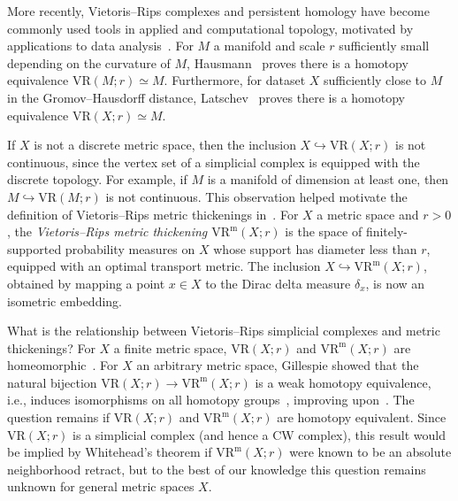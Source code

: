\documentclass[11pt, reqno, english]{amsart}
\theoremstyle{plain}
\theoremstyle{definition}
\theoremstyle{myremark}
\newcommand{\vr}[2]{\mathrm{VR}(#1;#2)}
\newcommand{\vrm}[2]{\mathrm{VR}^\mathrm{m}(#1;#2)}
\begin{document}
More recently, Vietoris--Rips complexes and persistent homology have become commonly used tools in applied and computational topology, motivated by applications to
data analysis~\cite{CarlssonIshkhanovDeSilvaZomorodian2008,ghrist2008barcodes}.
For $M$ a manifold and scale $r$ sufficiently small depending on the curvature of $M$, Hausmann~\cite{Hausmann1995} proves there is a homotopy equivalence $\vr{M}{r} \simeq M$.
Furthermore, for dataset $X$ sufficiently close to $M$ in the Gromov--Hausdorff distance, Latschev~\cite{Latschev2001} proves there is a homotopy equivalence $\vr{X}{r} \simeq M$.

If $X$ is not a discrete metric space, then the inclusion $X\hookrightarrow\vr{X}{r}$ is not continuous, since the vertex set of a simplicial complex is equipped with the discrete topology.
For example, if $M$ is a manifold of dimension at least one, then $M\hookrightarrow\vr{M}{r}$ is not continuous.
This observation helped motivate the definition of Vietoris--Rips metric thickenings in~\cite{AAF}.
For $X$ a metric space and $r>0$, the \emph{Vietoris--Rips metric thickening $\vrm{X}{r}$} is the space of finitely-supported probability measures on $X$ whose support has diameter less than $r$, equipped with an optimal transport metric.
The inclusion $X\hookrightarrow\vrm{X}{r}$, obtained by mapping a point $x\in X$ to the Dirac delta measure $\delta_x$, is now an isometric embedding.

What is the relationship between Vietoris--Rips simplicial complexes and metric thickenings?
For $X$ a finite metric space, $\vr{X}{r}$ and $\vrm{X}{r}$ are homeomorphic~\cite%
{AAF}.
For $X$ an arbitrary metric space, Gillespie showed that the natural bijection $\vr{X}{r}\to\vrm{X}{r}$ is a weak homotopy equivalence, i.e., induces isomorphisms on all homotopy groups~\cite{gillespie2024vietoris}, improving upon~\cite{HA-FF-ZV}.
The question remains if $\vr{X}{r}$ and $\vrm{X}{r}$ are homotopy equivalent.
Since $\vr{X}{r}$ is a simplicial complex (and hence a CW complex), this result would be implied by Whitehead's theorem if $\vrm{X}{r}$ were known to be an absolute neighborhood retract, %
but to the best of our knowledge this question remains unknown for general metric spaces $X$.
\end{document}
